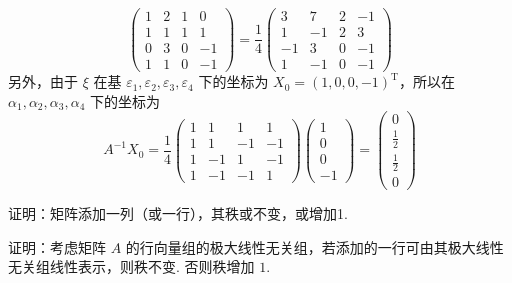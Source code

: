 \begin{exercise}
\begin{exgroup}
\begin{answer}
\[\begin{pmatrix}
                    1 & 2 & 1 & 0  \\
                    1 & 1 & 1 & 1  \\
                    0 & 3 & 0 & -1 \\
                    1 & 1 & 0 & -1
                \end{pmatrix} = \frac{1}{4} \begin{pmatrix}
                    3  & 7  & 2 & -1 \\
                    1  & -1 & 2 & 3  \\
                    -1 & 3  & 0 & -1 \\
                    1  & -1 & 0 & -1
                \end{pmatrix} \]
            另外，由于 $ \xi $ 在基 $ \varepsilon_1, \varepsilon_2, \varepsilon_3, \varepsilon_4 $ 下的坐标为 $ X_0 = (1, 0, 0, -1)^{\mathrm{T}} $，所以在 $ \alpha_1, \alpha_2, \alpha_3, \alpha_4 $ 下的坐标为
            \[ A^{-1} X_0 = \frac{1}{4} \begin{pmatrix}
                    1 & 1  & 1  & 1  \\
                    1 & 1  & -1 & -1 \\
                    1 & -1 & 1  & -1 \\
                    1 & -1 & -1 & 1
                \end{pmatrix} \begin{pmatrix}
                    1 \\ 0 \\ 0 \\ -1
                \end{pmatrix} = \begin{pmatrix}
                    0 \\ \frac{1}{2} \\ \frac{1}{2} \\ 0
                \end{pmatrix} \]
        \end{answer}

        \item 证明：矩阵添加一列（或一行），其秩或不变，或增加1.
        \begin{answer}
            证明：考虑矩阵 $A$ 的行向量组的极大线性无关组，若添加的一行可由其极大线性无关组线性表示，则秩不变. 否则秩增加 $1$.
        \end{answer}


\end{exgroup}
\end{exercise}
